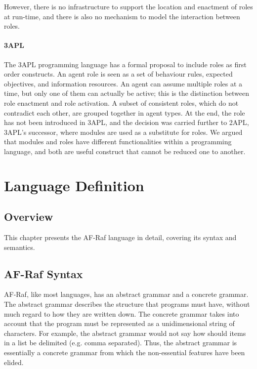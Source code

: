 \documentclass[a4paper,12pt,oneside,fleqn]{book} %
\newcommand{\todo}[1]{[\textcolor{red}{TODO}: #1]}
\begin{document}
{However, there is no infrastructure to support the location and enactment
of roles at run-time, and there is also no mechanism to model the
interaction between roles.

\subsubsection{3APL} %
The 3APL programming language\cite{DBLP:conf/aose/DastaniRHDM04} has a
formal proposal to include roles as first order constructs. An agent role
is seen as a set of behaviour rules, expected objectives, and information
resources. An agent can assume multiple roles at a time, but only one of
them can actually be active; this is the distinction between role enactment
and role activation. A subset of consistent roles, which do not contradict
each other, are grouped together in agent types. At the end, the role has
not been introduced in 3APL, and the decision was carried further to
2APL\cite{DBLP:journals/aamas/Dastani08}, 3APL's successor, where modules
are used as a substitute for roles. We argued that modules and roles have
different functionalities within a programming language, and both are
useful construct that cannot be reduced one to another.


\chapter{Language Definition}\label{ch:langdef} %


\section{Overview}\label{sec:langdef.overview} %

This chapter presents the AF-Raf language in detail, covering its syntax
and semantics.

\section{AF-Raf Syntax}\label{sec:langdef.syntax} %

AF-Raf, like most languages, has an abstract grammar and a concrete
grammar. The abstract grammar describes the structure that programs must
have, without much regard to how they are written down. The concrete
grammar takes into account that the program must be represented as a
unidimensional string of characters. For example, the abstract grammar
would not say how should items in a list be delimited (e.g. comma
separated). Thus, the abstract grammar is essentially a concrete grammar
from which the non-essential features have been elided.

}
\end{document}
